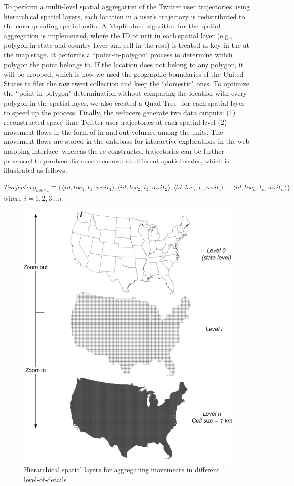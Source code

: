 \documentclass[a4paper, 11pt]{article}
\begin{document}
To perform a multi-level spatial aggregation of the Twitter user trajectories using hierarchical spatial layers, each location in a user's trajectory is redistributed to the corresponding spatial units. A MapReduce algorithm for the spatial aggregation is implemented, where the ID of unit in each spatial layer (e.g., polygon in state and country layer and cell in the rest) is treated as key in the at the map stage. It performs a ``point-in-polygon" process to determine which polygon the point belongs to. If the location does not belong to any polygon, it will be dropped, which is how we used the geographic boundaries of the United States to filer the raw tweet collection and keep the ``domestic" ones. To optimize the ``point-in-polygon" determination without comparing the location with every polygon in the spatial layer, we also created a Quad-Tree~\citep{samet1984quadtree} for each spatial layer to speed up the process. Finally, the reducers generate two data outputs: (1) reconstructed space-time Twitter user trajectories at each spatial level (2) movement flows in the form of in and out volumes among the units. The movement flows are stored in the database for interactive explorations in the web mapping interface, whereas the re-constructed trajectories can be further processed to produce distance measures at different spatial scales, which is illustrated as fellows:
\newline

\noindent $Trajectory_{user_{id}} \equiv \lbrace \langle id, loc_{1}, t_{1}, unit_{1}\rangle, \langle id, loc_{2}, t_{2}, unit_{2}\rangle, \langle id, loc_{i}, t_{i}, unit_{i}\rangle, ... \langle id, loc_{n}, t_{n}, unit_{n}\rangle \rbrace$
where $ i = 1, 2, 3...n$

\begin{figure}[h]
\centering
\includegraphics[width=0.6\linewidth]{./figures/multilevel}
\caption{Hierarchical spatial layers for aggregating movements in different level-of-details}
\label{fig:multilevel}
\end{figure}
\FloatBarrier
\end{document}
